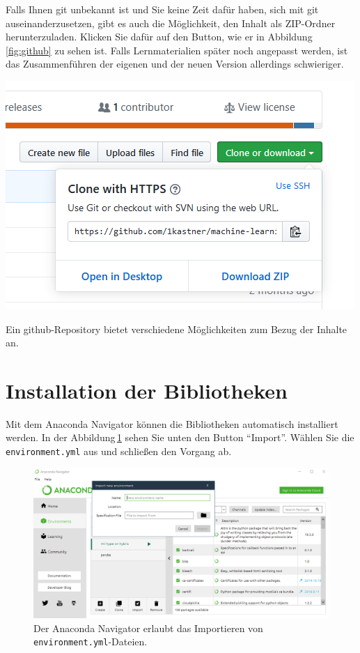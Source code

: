 \documentclass{tufte-handout}
\begin{document}
Falls Ihnen git unbekannt ist und Sie keine Zeit dafür haben, sich mit git auseinanderzusetzen, gibt es auch die Möglichkeit, den Inhalt als ZIP-Ordner herunterzuladen.
Klicken Sie dafür auf den Button, wie er in Abbildung\,\ref{fig:github} zu sehen ist.
Falls Lernmaterialien später noch angepasst werden, ist das Zusammenführen der eigenen und der neuen Version allerdings schwieriger.

\begin{marginfigure}
  \includegraphics{github-zip}
  \caption{Ein github-Repository bietet verschiedene Möglichkeiten zum Bezug der Inhalte an.}%
\label{fig:github}
\end{marginfigure}


\section{Installation der Bibliotheken}

Mit dem Anaconda Navigator können die Bibliotheken automatisch installiert werden.
In der Abbildung\,\ref{fig:anaconda-navigator} sehen Sie unten den Button \enquote{Import}.
Wählen Sie die \texttt{environment.yml} aus und schließen den Vorgang ab. 

\begin{figure}[h]
  \includegraphics{anaconda-navigator}
  \caption{Der Anaconda Navigator erlaubt das Importieren von \texttt{environment.yml}-Dateien.}%
\label{fig:anaconda-navigator}
\end{figure}
\end{document}
